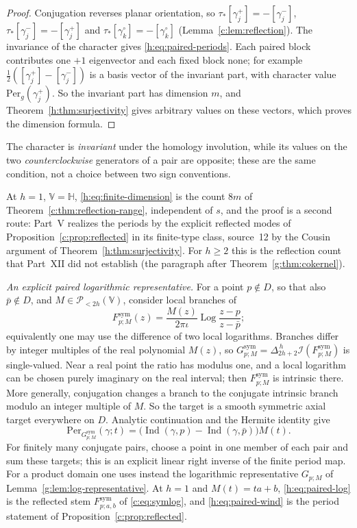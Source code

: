 \documentclass[11pt,a4paper]{article}
\numberwithin{equation}{section}
\theoremstyle{definition}
\theoremstyle{remark}
\theoremstyle{plain}
\newcommand{\HH}{\mathbb H}
\DeclareMathOperator{\Ind}{Ind}
\newcommand{\I}{\mathcal I}
\newcommand{\Per}{\mathrm{Per}}
\newcommand{\lapH}{\Delta_{2h+2}^{\,h}}
\newcommand{\VV}{\mathbb V}                       %
\newcommand{\PolH}{\mathscr P_{<2h}(\VV)}
\begin{document}
\begin{proof}
Conjugation reverses planar orientation, so
$\tau_*[\gamma^+_j]=-[\gamma^-_j]$, $\tau_*[\gamma^-_j]=-[\gamma^+_j]$ and
$\tau_*[\gamma^\circ_k]=-[\gamma^\circ_k]$ (Lemma~\ref{c:lem:reflection}). The
invariance of the character gives \eqref{h:eq:paired-periods}. Each paired
block contributes one $+1$ eigenvector and each fixed block none; for example
$\tfrac12([\gamma^+_j]-[\gamma^-_j])$ is a basis vector of the invariant part,
with character value $\Per_g(\gamma^+_j)$. So the invariant part has dimension
$m$, and Theorem~\ref{h:thm:surjectivity} gives arbitrary values on these
vectors, which proves the dimension formula.
\end{proof}

The character is \emph{invariant} under the homology involution, while its
values on the two \emph{counterclockwise} generators of a pair are opposite;
these are the same condition, not a choice between two sign conventions.

At $h=1$, $\VV=\HH$, \eqref{h:eq:finite-dimension} is the count $8m$ of
Theorem~\ref{c:thm:reflection-range}, independent of $s$, and the proof is a
second route: Part~V realizes the periods by the explicit reflected modes of
Proposition~\ref{c:prop:reflected} in its finite-type class, source~12 by the
Cousin argument of Theorem~\ref{h:thm:surjectivity}. For $h\ge2$ this is the
reflection count that Part~XII did not establish (the paragraph after
Theorem~\ref{g:thm:cokernel}).

\emph{An explicit paired logarithmic representative.} For a point $p\notin D$,
so that also $\bar p\notin D$, and $M\in\PolH$, consider local branches of
\begin{equation}\label{h:eq:paired-log}
 F^{\mathrm{sym}}_{p;M}(z)=\frac{M(z)}{2\pi\iota}\operatorname{Log}
 \frac{z-p}{z-\bar p};
\end{equation}
equivalently one may use the difference of two local logarithms. Branches
differ by integer multiples of the real polynomial $M(z)$, so
$G^{\mathrm{sym}}_{p;M}=\lapH\I(F^{\mathrm{sym}}_{p;M})$ is single-valued. Near
a real point the ratio has modulus one, and a local logarithm can be chosen
purely imaginary on the real interval; then $F^{\mathrm{sym}}_{p;M}$ is
intrinsic there. More generally, conjugation changes a branch to the conjugate
intrinsic branch modulo an integer multiple of $M$. So the target is a smooth
symmetric axial target everywhere on $D$. Analytic continuation and the Hermite
identity give
\begin{equation}\label{h:eq:paired-wind}
 \Per_{G^{\mathrm{sym}}_{p;M}}(\gamma;t)
 =\bigl(\Ind(\gamma,p)-\Ind(\gamma,\bar p)\bigr)M(t).
\end{equation}
For finitely many conjugate pairs, choose a point in one member of each pair
and sum these targets; this is an explicit linear right inverse of the finite
period map. For a product domain one uses instead the logarithmic
representative $G_{p;M}$ of Lemma~\ref{g:lem:log-representative}. At $h=1$ and
$M(t)=ta+b$, \eqref{h:eq:paired-log} is the reflected stem
$F^{\mathrm{sym}}_{p;a,b}$ of \eqref{c:eq:symlog}, and \eqref{h:eq:paired-wind}
is the period statement of Proposition~\ref{c:prop:reflected}.
\end{document}
